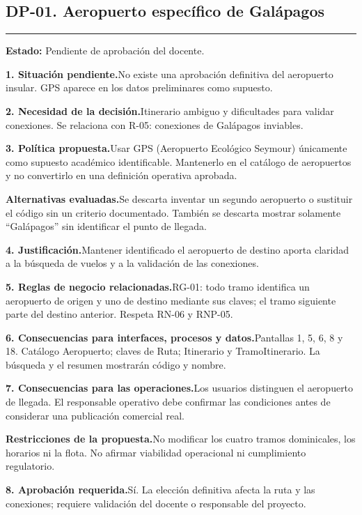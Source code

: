 \documentclass[11pt,a4paper]{article}
\newcommand{\fichacampo}[2]{\noindent\textbf{\color{azulvip}#1}\enspace #2\par\vspace{3pt}}
\begin{document}
\subsection{DP-01. Aeropuerto específico de Galápagos}
{\color{doradovip}\rule{\textwidth}{.5pt}}
\textbf{Estado:} Pendiente de aprobación del docente.\par\vspace{4pt}
{\normalsize
\fichacampo{1. Situación pendiente.}{No existe una aprobación definitiva del aeropuerto insular. GPS aparece en los datos preliminares como supuesto.}
\fichacampo{2. Necesidad de la decisión.}{Itinerario ambiguo y dificultades para validar conexiones. Se relaciona con R-05: conexiones de Galápagos inviables.}
\fichacampo{3. Política propuesta.}{Usar GPS (Aeropuerto Ecológico Seymour) únicamente como supuesto académico identificable. Mantenerlo en el catálogo de aeropuertos y no convertirlo en una definición operativa aprobada.}
\fichacampo{Alternativas evaluadas.}{Se descarta inventar un segundo aeropuerto o sustituir el código sin un criterio documentado. También se descarta mostrar solamente “Galápagos” sin identificar el punto de llegada.}
\fichacampo{4. Justificación.}{Mantener identificado el aeropuerto de destino aporta claridad a la búsqueda de vuelos y a la validación de las conexiones.}
\fichacampo{5. Reglas de negocio relacionadas.}{RG-01: todo tramo identifica un aeropuerto de origen y uno de destino mediante sus claves; el tramo siguiente parte del destino anterior. Respeta RN-06 y RNP-05.}
\fichacampo{6. Consecuencias para interfaces, procesos y datos.}{Pantallas 1, 5, 6, 8 y 18. Catálogo Aeropuerto; claves de Ruta; Itinerario y TramoItinerario. La búsqueda y el resumen mostrarán código y nombre.}
\fichacampo{7. Consecuencias para las operaciones.}{Los usuarios distinguen el aeropuerto de llegada. El responsable operativo debe confirmar las condiciones antes de considerar una publicación comercial real.}
\fichacampo{Restricciones de la propuesta.}{No modificar los cuatro tramos dominicales, los horarios ni la flota. No afirmar viabilidad operacional ni cumplimiento regulatorio.}
\fichacampo{8. Aprobación requerida.}{Sí. La elección definitiva afecta la ruta y las conexiones; requiere validación del docente o responsable del proyecto.}
}
\clearpage
\end{document}
